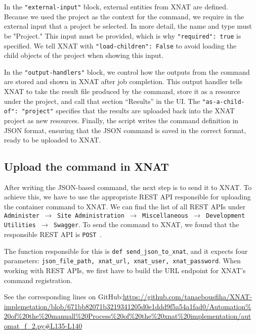 In the \texttt{"external-input"} block, external entities from XNAT are defined. Because we used the project as the context for the command, we require in the external input that a project be selected. In more detail, the name and type must be "Project." This input must be provided, which is why \texttt{"required": true} is specified. We tell XNAT with \texttt{"load-children": False} to avoid loading the child objects of the project when showing this input.

In the \texttt{"output-handlers"} block, we control how the outputs from the command are stored and shown in XNAT after job completion. This output handler tells XNAT to take the result file produced by the command, store it as a resource under the project, and call that section ``Results'' in the UI. The \texttt{"as-a-child-of": "project"} specifies that the results are uploaded back into the XNAT project as new resources.
\normalsize
Finally, the script writes the command definition in JSON format, ensuring that the JSON command is saved in the correct format, ready to be uploaded to XNAT.

\subsection{Upload the command in XNAT}

After writing the JSON-based command, the next step is to send it to XNAT. To achieve this, we have to use the appropriate REST API responsible for uploading the container command to XNAT.
We can find the list of all REST APIs under \texttt{Administer $\rightarrow$ Site Administration $\rightarrow$ Miscellaneous $\rightarrow$ Development Utilities $\rightarrow$ Swagger}.
To send the command to XNAT, we found that the responsible REST API is \texttt{POST}~\cite{ContainerRESTAPILIST}.

The function responsible for this is \texttt{def send\_json\_to\_xnat}, and it expects four parameters: \texttt{json\_file\_path, xnat\_url, xnat\_user, xnat\_password}. When working with REST APIs, we first have to build the URL endpoint for XNAT’s command registration.
 


\noindent\footnotesize See the corresponding lines on GitHub:\url{https://github.com/tanaebousfiha/XNAT-implemetation/blob/671bb82071b3219341205d0e1ddd9f5a54a1fad0/Automation%20of%20the%20manuall%20Process%20of%20the%20xnat%20implementation/automat_f_2.py#L135-L140}
\normalsize

